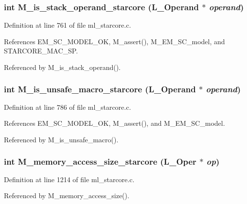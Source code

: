 \subsubsection{\setlength{\rightskip}{0pt plus 5cm}int M\_\-is\_\-stack\_\-operand\_\-starcore (L\_\-Operand $\ast$ {\em operand})}\label{ml__starcore_8c_ac6b35a14f04c7cfba9694df3dcfd595}




Definition at line 761 of file ml\_\-starcore.c.

References EM\_\-SC\_\-MODEL\_\-OK, M\_\-assert(), M\_\-EM\_\-SC\_\-model, and STARCORE\_\-MAC\_\-SP.

Referenced by M\_\-is\_\-stack\_\-operand().
\subsubsection{\setlength{\rightskip}{0pt plus 5cm}int M\_\-is\_\-unsafe\_\-macro\_\-starcore (L\_\-Operand $\ast$ {\em operand})}\label{ml__starcore_8c_4a9938a045c1c7f45d9f19ab6c5f6114}




Definition at line 786 of file ml\_\-starcore.c.

References EM\_\-SC\_\-MODEL\_\-OK, M\_\-assert(), and M\_\-EM\_\-SC\_\-model.

Referenced by M\_\-is\_\-unsafe\_\-macro().
\subsubsection{\setlength{\rightskip}{0pt plus 5cm}int M\_\-memory\_\-access\_\-size\_\-starcore (L\_\-Oper $\ast$ {\em op})}\label{ml__starcore_8c_3214ba36268c4776cf9d904f6dc1dbc0}




Definition at line 1214 of file ml\_\-starcore.c.

Referenced by M\_\-memory\_\-access\_\-size().
